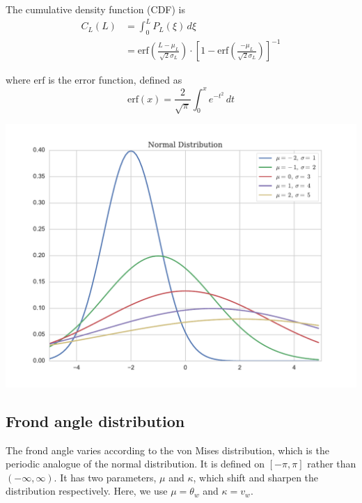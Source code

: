 \documentclass[10pt]{article}
\newenvironment{mcfig}
	{\par\medskip\noindent\minipage{\linewidth}}
	{\endminipage\par\medskip}
\newcommand{\erf}{\mbox{erf}}
\begin{document}
\begin{multicols}{2}
The cumulative density function (CDF) is
\begin{align}
	C_L(L) &= \int_0^L P_L(\xi)\,d\xi  \nonumber \\
	&= \erf\left(\frac{L-\mu_L}{\sqrt{2}\sigma_L}\right)
	\cdot \left[1-\erf \left(\frac{-\mu_L}{\sqrt{2}\sigma_L}\right) \right]^{-1}
\end{align}

where $\erf$ is the error function, defined as 
\begin{equation}
	\erf(x) = \frac{2}{\sqrt{\pi}}\int_0^x e^{-t^2}\,dt
\end{equation}

\begin{mcfig}
	\centering
	\vspace{-1em}
	\includegraphics[width=\linewidth]{normal}
	\vspace{-2em}
	\label{fig:normal}
\end{mcfig}

\subsection{Frond angle distribution}
\label{sec:angle_dist}
The frond angle varies according to the von Mises distribution, which is the periodic analogue of the normal distribution.
It is defined on $[-\pi,\pi]$ rather than $(-\infty,\infty)$.
It has two parameters, $\mu$ and $\kappa$, which shift and sharpen the distribution respectively.
Here, we use $\mu = \theta_w$ and $\kappa = v_w$.


\end{multicols}
\end{document}
